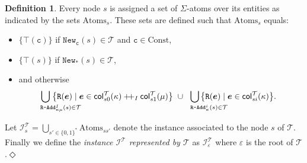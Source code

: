 \documentclass[10pt,a4paper]{amsart}
\theoremstyle{definition}
\numberwithin{equation}{section}
\theoremstyle{plain}
\theoremstyle{definition}
\newtheorem{definition}[definition]{Definition}
\theoremstyle{myexample}
\theoremstyle{plain}
\theoremstyle{definition}
\renewcommand{\vec}[1]{\boldsymbol{#1}}
\newcommand{\instance}{\mathcal{I}}
\newcommand{\inst}{\instance}
\newcommand{\newconst}[1]{\pred{New}_{\const{#1}}} %
\newcommand{\newanon}{\pred{New}_{\const{*}}} %
\newcommand{\radd}[4]{#4\pred{\texttt{-}Add}^{#3}_{#1#2}}
\newcommand{\unradd}[2]{#2\pred{\texttt{-}Add}_{#1}}
\newcommand{\fcn}[1]{\mathsf{#1}}
\newcommand{\col}{\fcn{col}}
\newcommand{\pred}[1]{\mathtt{#1}}
\newcommand{\const}[1]{\mathtt{#1}}
\newcommand{\ve}{\vec{e}}
\newcommand{\rpred}{\pred{R}}
\newcommand{\concat}{\mathbin{{+}\hspace{-0.5ex}{+}}}
\newcommand{\defend}{\hfill\ensuremath{\Diamond}}
\begin{document}
\begin{definition}
%
Every node $s$ is assigned a set of $\Sigma$-atoms over its entities as indicated by the sets $\mathrm{Atoms}_s$. These sets are defined such that $\mathrm{Atoms}_s$ equals:
\begin{itemize}
	\item \!$\{ \top(\const{c}) \}$ if $\newconst{c}(s)\in\mathcal{T}$ and $\const{c}\in\mathrm{Const}$,
	\item \!$\{ \top(s) \}$ if $\newanon(s)\in\mathcal{T}$,
	\item and otherwise
		\begin{align*}
			 \hspace{-10ex}\bigcup_{\hspace{8.5ex}\radd{\kappa}{\mu}{I}{\rpred}(s)\in\mathcal{T}} \hspace{-8.5ex}\big\{  \rpred(\ve) \mid  \ve  \in \col_{s0}^{\mathcal{T}}(\kappa)\concat_{I}\col_{s1}^{\mathcal{T}}(\mu) \big\} \ 
			 \cup 
			  \hspace{-6.5ex}\bigcup_{\hspace{8ex}\unradd{\kappa}{\rpred}^i(s)\in\mathcal{T}}\hspace{-8ex} \big\{ \rpred(\ve) \mid  \ve\in\col_{si}^{\mathcal{T}}(\kappa) \big\}.
		\end{align*}
\end{itemize}
%
Let 
$\inst^{\mathcal{T}}_s = \bigcup_{s'\in\{ 0,1 \}^*}\mathrm{Atoms}_{ss'}$ denote the instance associated to the node $s$ of $\mathcal{T}$. Finally we define the \emph{instance $\inst^{\mathcal{T}}$ represented by $\mathcal{T}$} as $\inst^{\mathcal{T}}_{\varepsilon}$ where $\varepsilon$ is the root of $\mathcal{T}$.\defend
\end{definition}
\end{document}
